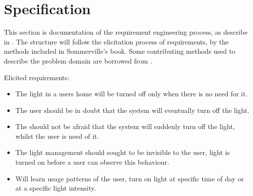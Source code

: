 \section{Specification}
\label{sec:specification}
This section is documentation of the requirement engineering process, as describe in \cite{sommerville}. The structure will follow the elicitation process of requirements, by the methods included in Sommerville's book. Some contributing methods used to describe the problem domain are borrowed from \cite{OOAD}.














Elicited requirements: %

\begin{itemize}
  \item The light in a users home will be turned off only when there is no need for it.
  \item The user should be in doubt that the system will eventually turn off the light.
  \item The should not be afraid that the system will suddenly turn off the light, whilst the user is need of it.
  \item The light management should sought to be invisible to the user, light is turned on before a user can observe this behaviour.
  \item Will learn usage patterns of the user, turn on light at specific time of day or at a specific light intensity.
\end{itemize}
